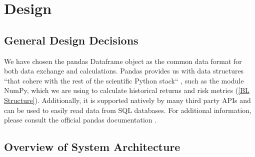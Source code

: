 \documentclass[main.tex]{subfiles}
\begin{document}
\section{Design}
\label{Design}

\subsection{General Design Decisions}
We have chosen the pandas Dataframe \cite{pandas} object as the common data format for both data exchange and calculations. Pandas provides us with data structures ``that cohere with the rest of the scientific Python stack`` \cite{mckinney2011pandas}, such as the module NumPy, which we are using to calculate historical returns and risk metrics (\ref{BL Structure}). Additionally, it is supported natively by many third party APIs and can be used to easily read data from SQL databases. For additional information, please consult the official pandas documentation \cite{pandas}.

\subsection{Overview of System Architecture}
\end{document}
